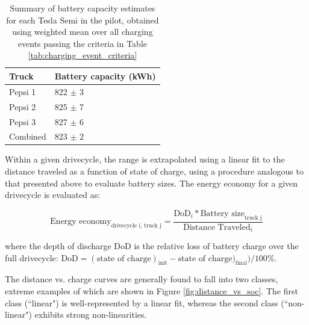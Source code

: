 \begin{table}[ht]
\centering
\begin{tabular}{P{4cm}P{6cm}} %
\toprule %
\textbf{Truck} & \textbf{Battery capacity (kWh)} \\ \midrule %
Pepsi 1 & 822 $\pm$ 3 \\
\midrule
Pepsi 2 & 825 $\pm$ 7 \\
\midrule
Pepsi 3 & 827 $\pm$ 6 \\
\midrule
Combined & 823 $\pm$ 2 \\
\bottomrule %
\end{tabular}
\caption{Summary of battery capacity estimates for each Tesla Semi in the pilot, obtained using weighted mean over all charging events passing the criteria in Table \ref{tab:charging_event_criteria}}
\label{tab:battery_capacity_summary}
\end{table}

Within a given drivecycle, the range is extrapolated using a linear fit to the distance traveled as a function of state of charge, using a procedure analogous to that presented above to evaluate battery sizes. The energy economy for a given drivecycle is evaluated as:

\begin{equation}
    \text{Energy economy}_\text{drivecycle i, truck j} = \frac{\text{DoD}_i * \text{Battery size}_\text{truck j}}{\text{Distance Traveled}_i}
\end{equation}

where the depth of discharge DoD is the relative loss of battery charge over the full drivecycle: $\text{DoD} = (\text{state of charge})_\text{init} - \text{state of charge})_\text{final}) / 100\%$.

The distance vs. charge curves are generally found to fall into two classes, extreme examples of which are shown in Figure \ref{fig:distance_vs_soc}. The first class (``linear") is well-represented by a linear fit, whereas the second class (``non-linear") exhibits strong non-linearities. 

